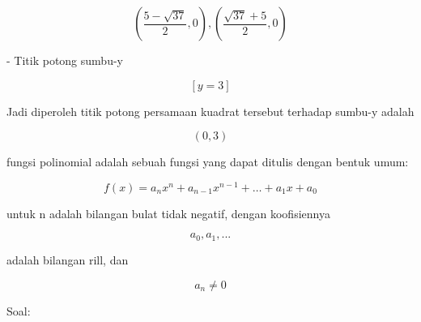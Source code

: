 \documentclass[a4paper,10pt]{article}
\begin{document}
\begin{eulernotebook}
\begin{eulercomment}
\begin{eulercomment}
\begin{eulercomment}
\begin{eulercomment}
\begin{eulercomment}
\end{eulercomment}
\begin{eulerformula}
\[
(\frac{5 - \sqrt{37}}{2}, 0), (\frac{\sqrt{37} + 5}{2}, 0)
\]
\end{eulerformula}
\begin{eulercomment}
\end{eulercomment}
\begin{eulercomment}
- Titik potong sumbu-y
\end{eulercomment}
\begin{eulerformula}
\[
\left[ y=3 \right] 
\]
\end{eulerformula}
\begin{eulercomment}
Jadi diperoleh titik potong persamaan kuadrat tersebut terhadap
sumbu-y adalah

\end{eulercomment}
\begin{eulerformula}
\[
(0, 3)
\]
\end{eulerformula}
\begin{eulercomment}
\end{eulercomment}
\begin{eulercomment}
fungsi polinomial adalah sebuah fungsi yang dapat ditulis dengan
bentuk umum:

\end{eulercomment}
\begin{eulerformula}
\[
f(x) = a_{n}x^{n} + a_{n-1}x^{n-1} + \dots + a_{1}x + a_0
\]
\end{eulerformula}
\begin{eulercomment}
untuk n adalah bilangan bulat tidak negatif, dengan koofisiennya 

\end{eulercomment}
\begin{eulerformula}
\[
a_0, a_1, ...
\]
\end{eulerformula}
\begin{eulercomment}
adalah bilangan rill, dan 

\end{eulercomment}
\begin{eulerformula}
\[
a_n \neq 0
\]
\end{eulerformula}
\begin{eulercomment}
\end{eulercomment}
\begin{eulercomment}
Soal:


\end{eulercomment}
\end{eulercomment}
\end{eulercomment}
\end{eulercomment}
\end{eulercomment}
\end{eulernotebook}
\end{document}
